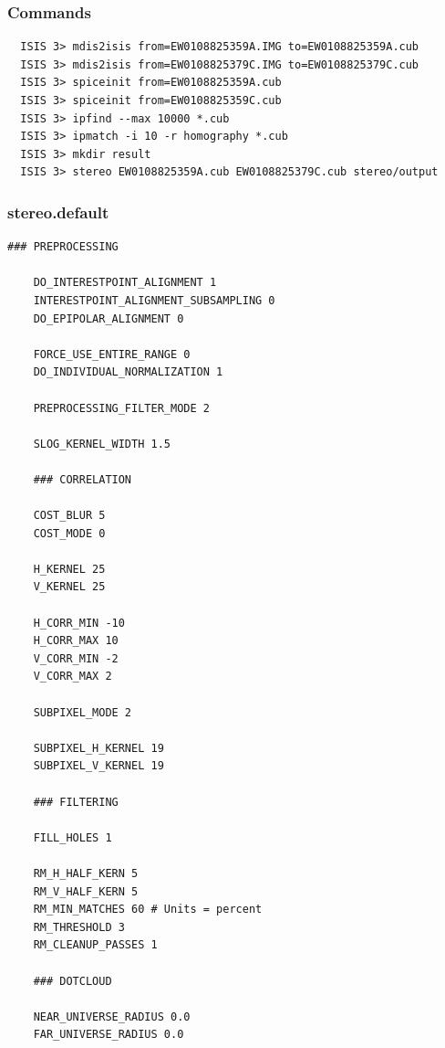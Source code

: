 \subsubsection*{Commands}

\begin{verbatim}
  ISIS 3> mdis2isis from=EW0108825359A.IMG to=EW0108825359A.cub
  ISIS 3> mdis2isis from=EW0108825379C.IMG to=EW0108825379C.cub
  ISIS 3> spiceinit from=EW0108825359A.cub
  ISIS 3> spiceinit from=EW0108825359C.cub
  ISIS 3> ipfind --max 10000 *.cub
  ISIS 3> ipmatch -i 10 -r homography *.cub
  ISIS 3> mkdir result
  ISIS 3> stereo EW0108825359A.cub EW0108825379C.cub stereo/output
\end{verbatim}

\subsubsection*{stereo.default}

\begin{center}\begin{minipage}{5.5in}
\begin{Verbatim}[frame=single,fontsize=\small,label=stereo.default for MDIS]
    ### PREPROCESSING

    DO_INTERESTPOINT_ALIGNMENT 1
    INTERESTPOINT_ALIGNMENT_SUBSAMPLING 0
    DO_EPIPOLAR_ALIGNMENT 0

    FORCE_USE_ENTIRE_RANGE 0
    DO_INDIVIDUAL_NORMALIZATION 1

    PREPROCESSING_FILTER_MODE 2

    SLOG_KERNEL_WIDTH 1.5

    ### CORRELATION

    COST_BLUR 5
    COST_MODE 0

    H_KERNEL 25
    V_KERNEL 25

    H_CORR_MIN -10
    H_CORR_MAX 10
    V_CORR_MIN -2
    V_CORR_MAX 2

    SUBPIXEL_MODE 2

    SUBPIXEL_H_KERNEL 19
    SUBPIXEL_V_KERNEL 19

    ### FILTERING

    FILL_HOLES 1

    RM_H_HALF_KERN 5
    RM_V_HALF_KERN 5
    RM_MIN_MATCHES 60 # Units = percent
    RM_THRESHOLD 3
    RM_CLEANUP_PASSES 1

    ### DOTCLOUD

    NEAR_UNIVERSE_RADIUS 0.0
    FAR_UNIVERSE_RADIUS 0.0
\end{Verbatim}
\end{minipage}\end{center}

